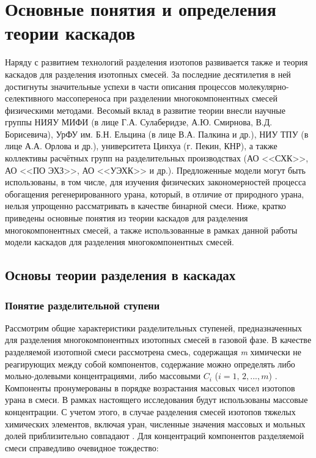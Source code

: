 \chapter{Основные понятия и определения теории каскадов}\label{ch2_theory}

Наряду с развитием технологий разделения изотопов развивается также и теория каскадов для разделения изотопных смесей. За последние десятилетия в ней достигнуты значительные успехи в части описания процессов молекулярно-селективного массопереноса при разделении многокомпонентных смесей физическими методами. Весомый вклад в развитие теории внесли научные группы НИЯУ МИФИ (в лице Г.А. Сулаберидзе, А.Ю. Смирнова, В.Д. Борисевича), УрФУ им. Б.Н. Ельцина (в лице В.А. Палкина и др.), НИУ ТПУ (в лице А.А. Орлова и др.), университета Цинхуа (г. Пекин, КНР), а также коллективы расчётных групп на разделительных производствах (АО <<СХК>>, АО <<ПО ЭХЗ>>, АО <<УЭХК>> и др.). Предложенные модели могут быть использованы, в том числе, для изучения физических закономерностей процесса обогащения регенерированного урана, который, в отличие от природного урана, нельзя упрощенно рассматривать в качестве бинарной смеси.
Ниже, кратко приведены основные понятия из теории каскадов для разделения многокомпонентных смесей, а также использованные в рамках данной работы модели каскадов для разделения многокомпонентных смесей.

\section{Основы теории разделения в каскадах}


\subsection{Понятие разделительной ступени}

Рассмотрим общие характеристики разделительных ступеней, предназначенных для разделения многокомпонентных изотопных смесей в газовой фазе. В качестве разделяемой изотопной смеси рассмотрена смесь, содержащая \textit{m} химически не реагирующих между собой компонентов, содержание можно определять либо мольно-долевыми концентрациями, либо массовыми $C_{i}$ ($i=1,\, 2,...,m$) \cite{sulaberidzeTeoriyaKaskadovDlya2011}. Компоненты пронумерованы в порядке возрастания массовых чисел изотопов урана в смеси. В рамках настоящего исследования будут использованы массовые концентрации. С учетом этого, в случае разделения смесей изотопов тяжелых химических элементов, включая уран, численные значения массовых и мольных долей приблизительно совпадают \cite{sulaberidzeTeoriyaKaskadovDlya2011}.  Для концентраций компонентов разделяемой смеси справедливо очевидное тождество:

